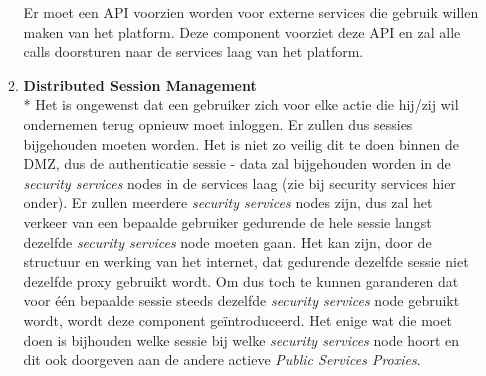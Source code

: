 \documentclass[a4paper,10pt]{article}
\begin{document}
\begin{enumerate}
\begin{enumerate}
Er moet een API voorzien worden voor externe services die gebruik willen maken van het platform. Deze component voorziet deze API en zal alle calls doorsturen naar de services laag van het platform.
\item \textbf{Distributed Session Management}\\*
Het is ongewenst dat een gebruiker zich voor elke actie die hij/zij wil ondernemen terug opnieuw moet inloggen. Er zullen dus sessies bijgehouden moeten worden. Het is niet zo veilig dit te doen binnen de DMZ, dus de authenticatie sessie - data zal bijgehouden worden in de \textit{security services} nodes in de services laag (zie bij security services hier onder). Er zullen meerdere \textit{security services} nodes zijn, dus zal het verkeer van een bepaalde gebruiker gedurende de hele sessie langst dezelfde \textit{security services} node moeten gaan. Het kan zijn, door de structuur en werking van het internet, dat gedurende dezelfde sessie niet dezelfde proxy gebruikt wordt. Om dus toch te kunnen garanderen dat voor één bepaalde sessie steeds dezelfde \textit{security services} node gebruikt wordt, wordt deze component geïntroduceerd. Het enige wat die moet doen is bijhouden welke sessie bij welke \textit{security services} node hoort en dit ook doorgeven aan de andere actieve \textit{Public Services Proxies}.
\end{enumerate}


\end{enumerate}
\end{document}
